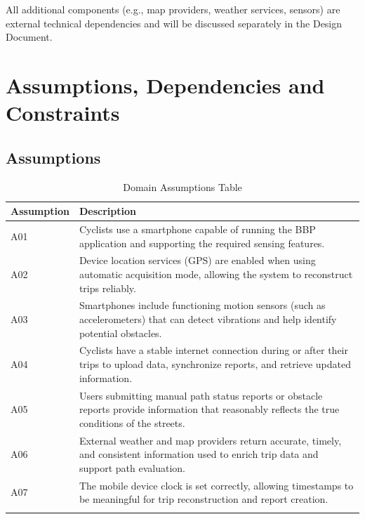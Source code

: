 \par All additional components (e.g., map providers, weather services, sensors) are external technical dependencies and will be discussed separately in the Design Document.


\section{Assumptions, Dependencies and Constraints}
\label{sec:assumptions_dependencies_and_constraints}

\subsection{Assumptions}
\label{sub:assumptions}

\begin{longtable}{|l|p{}|}
\hline
\textbf{Assumption} & \textbf{Description} \\
\hline
A01 & Cyclists use a smartphone capable of running the BBP application and supporting the required sensing features. \\
\hline
A02 & Device location services (GPS) are enabled when using automatic acquisition mode, allowing the system to reconstruct trips reliably. \\
\hline
A03 & Smartphones include functioning motion sensors (such as accelerometers) that can detect vibrations and help identify potential obstacles. \\
\hline
A04 & Cyclists have a stable internet connection during or after their trips to upload data, synchronize reports, and retrieve updated information. \\
\hline
A05 & Users submitting manual path status reports or obstacle reports provide information that reasonably reflects the true conditions of the streets. \\
\hline
A06 & External weather and map providers return accurate, timely, and consistent information used to enrich trip data and support path evaluation. \\
\hline
A07 & The mobile device clock is set correctly, allowing timestamps to be meaningful for trip reconstruction and report creation. \\
\hline
\caption{Domain Assumptions Table}
\label{tab:domain_assumptions}
\end{longtable}

